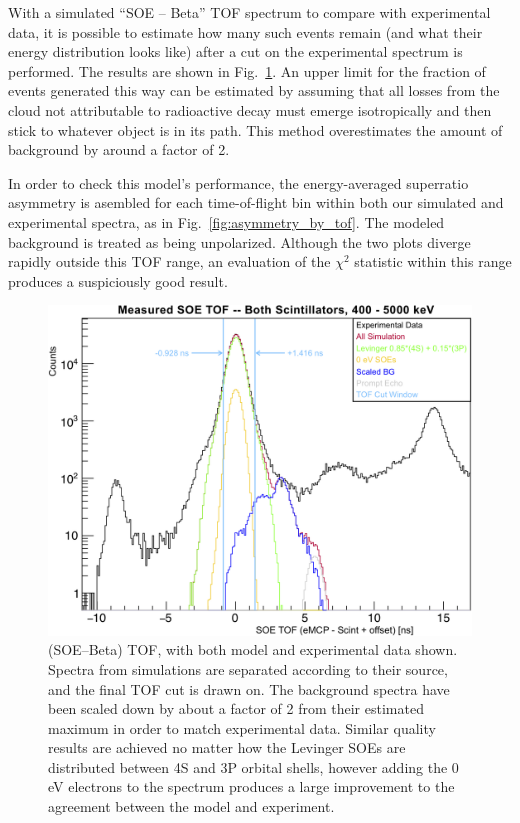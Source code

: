 With a simulated ``SOE -- Beta'' TOF spectrum to compare with experimental data, it is possible to estimate how many such events remain (and what their energy distribution looks like) after a cut on the experimental spectrum is performed. The results are shown in Fig.~\ref{fig:soetof}.  An upper limit for the fraction of events generated this way can be estimated by assuming that all losses from the cloud not attributable to radioactive decay must emerge isotropically and then stick to whatever object is in its path.  This method overestimates the amount of background by around a factor of 2. 


In order to check this model's performance, the energy-averaged superratio asymmetry is asembled for each time-of-flight bin within both our simulated and experimental spectra, as in Fig.~\ref{fig:asymmetry_by_tof}.  The modeled background is treated as being unpolarized.  Although the two plots diverge rapidly outside this TOF range, an evaluation of the $\chi^2$ statistic within this range produces a suspiciously good result.  


\begin{figure}[h!tb]
	\centering
	\includegraphics[width=.999\linewidth]
	{Figures/SOE_TOF_Spectra.png}
	\caption[(SOE--Beta) TOF]{(SOE--Beta) TOF, with both model and experimental data shown.  Spectra from simulations are separated according to their source, and the final TOF cut is drawn on.  The background spectra have been scaled down by about a factor of 2 from their estimated maximum in order to match experimental data.  Similar quality results are achieved no matter how the Levinger SOEs are distributed between 4S and 3P orbital shells, however adding the 0 eV electrons to the spectrum produces a large improvement to the agreement between the model and experiment.
	}	
	\label{fig:soetof}
\end{figure}

